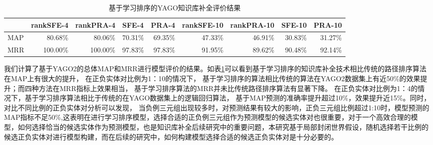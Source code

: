 \begin{table}[htbp]
  \centering
  \caption{基于学习排序的YAGO知识库补全评价结果}
    \begin{tabular}{|l|r|r|r|r|r|r|r|r|}
    \hline
          & \multicolumn{1}{l|}{rankSFE-4} & \multicolumn{1}{l|}{rankPRA-4} & \multicolumn{1}{l|}{SFE-4} & \multicolumn{1}{l|}{PRA-4} & \multicolumn{1}{l|}{rankSFE-10} & \multicolumn{1}{l|}{rankPRA-10} & \multicolumn{1}{l|}{SFE-10} & \multicolumn{1}{l|}{PRA-10} \bigstrut\\
    \hline
    MAP   & 80.68\% & 80.06\% & 70.31\% & 69.35\% & 47.33\% & 46.91\% & 30.83\% & 31.27\% \bigstrut\\
    \hline
    MRR   & 100.00\% & 100.00\% & 97.83\% & 97.83\% & 91.95\% & 89.62\% & 90.48\% & 92.14\% \bigstrut\\
    \hline
    \end{tabular}%
  \label{tab:kbc-yago-rank}%
\end{table}%

我们计算了基于YAGO2的总体MAP和MRR进行模型评价的结果。如表\ref{tab:kbc-yago-rank}可以看到基于学习排序的知识库补全技术相比传统的路径排序算法在MAP上有很大的提升，
在正负实体对比例为1：10的情况下，
基于学习排序的算法相比传统的算法在YAGO2数据集上有近50\%的效果提升；而四种方法在MRR指标上效果相当，
基于学习排序算法的MRR并未比传统路径排序算法有显著下降。
在正负实体对比例为1：4的情况下，基于学习排序算法相比于传统的在YAGO数据集上的逻辑回归算法，
基于MAP预测的准确率提升超过10\%，效果提升近15\%。同时，对比不同比例的正负实体对分析可以发现，
当负例三元组出现较多时，对预测结果有较大的影响，正负三元组比例超过1:10时，模型预测的MAP指标不足50\%,这表明在进行学习排序模型，选择合适的正负例三元组作为预测模型的候选实体对也很重要，对于一个高效合理的模型，如何选择恰当的候选实体作为预测模型，也是知识库补全后续研究中的重要问题，本研究基于局部封闭世界假设，随机选择若干比例的候选正负实体对进行模型构建，而在后续的研究中，如何构建模型选择合适的候选正负实体对是十分必要的。

